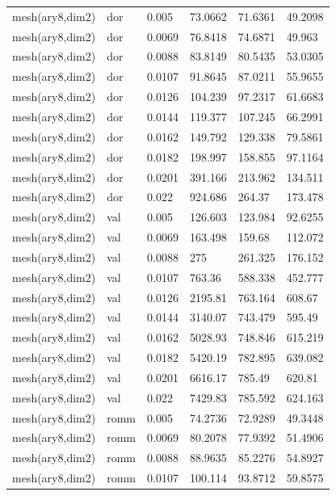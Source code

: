 \begin{longtable}[H]{llllll}
mesh(ary8,dim2) & dor        & 0.005  & 73.0662 & 71.6361 & 49.2098 \\
mesh(ary8,dim2) & dor        & 0.0069 & 76.8418 & 74.6871 & 49.963  \\
mesh(ary8,dim2) & dor        & 0.0088 & 83.8149 & 80.5435 & 53.0305 \\
mesh(ary8,dim2) & dor        & 0.0107 & 91.8645 & 87.0211 & 55.9655 \\
mesh(ary8,dim2) & dor        & 0.0126 & 104.239 & 97.2317 & 61.6683 \\
mesh(ary8,dim2) & dor        & 0.0144 & 119.377 & 107.245 & 66.2991 \\
mesh(ary8,dim2) & dor        & 0.0162 & 149.792 & 129.338 & 79.5861 \\
mesh(ary8,dim2) & dor        & 0.0182 & 198.997 & 158.855 & 97.1164 \\
mesh(ary8,dim2) & dor        & 0.0201 & 391.166 & 213.962 & 134.511 \\
mesh(ary8,dim2) & dor        & 0.022  & 924.686 & 264.37  & 173.478 \\ \hline
mesh(ary8,dim2) & val        & 0.005  & 126.603 & 123.984 & 92.6255 \\
mesh(ary8,dim2) & val        & 0.0069 & 163.498 & 159.68  & 112.072 \\
mesh(ary8,dim2) & val        & 0.0088 & 275     & 261.325 & 176.152 \\
mesh(ary8,dim2) & val        & 0.0107 & 763.36  & 588.338 & 452.777 \\
mesh(ary8,dim2) & val        & 0.0126 & 2195.81 & 763.164 & 608.67  \\
mesh(ary8,dim2) & val        & 0.0144 & 3140.07 & 743.479 & 595.49  \\
mesh(ary8,dim2) & val        & 0.0162 & 5028.93 & 748.846 & 615.219 \\
mesh(ary8,dim2) & val        & 0.0182 & 5420.19 & 782.895 & 639.082 \\
mesh(ary8,dim2) & val        & 0.0201 & 6616.17 & 785.49  & 620.81  \\
mesh(ary8,dim2) & val        & 0.022  & 7429.83 & 785.592 & 624.163 \\ \hline
mesh(ary8,dim2) & romm       & 0.005  & 74.2736 & 72.9289 & 49.3448 \\
mesh(ary8,dim2) & romm       & 0.0069 & 80.2078 & 77.9392 & 51.4906 \\
mesh(ary8,dim2) & romm       & 0.0088 & 88.9635 & 85.2276 & 54.8927 \\
mesh(ary8,dim2) & romm       & 0.0107 & 100.114 & 93.8712 & 59.8575 \\

\end{longtable}
